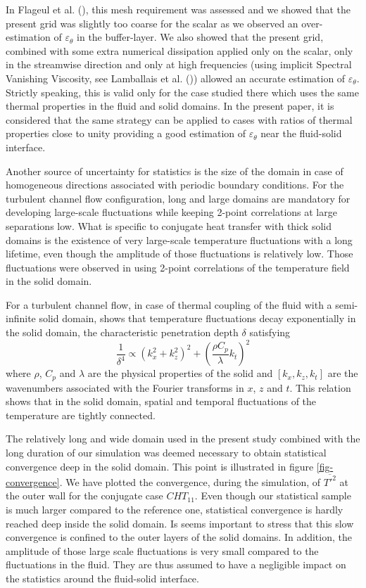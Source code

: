 \documentclass[review]{elsarticle}
\begin{document}
In Flageul et al. (\cite{flageul2015dns}), this mesh requirement was assessed and we showed that the present grid was slightly too coarse for the scalar as we observed an over-estimation of $\varepsilon_\theta$ in the buffer-layer.
We also showed that the present grid, combined with some extra numerical dissipation applied only on the scalar, only in the streamwise direction and only at high frequencies (using implicit Spectral Vanishing Viscosity, see Lamballais et al. (\cite{lamballais2011straightforward})) allowed an accurate estimation of $\varepsilon_\theta$.
Strictly speaking, this is valid only for the case studied there which uses the same thermal properties in the fluid and solid domains.
In the present paper, it is considered that the same strategy can be applied to cases with ratios of thermal properties close to unity providing a good estimation of $\varepsilon_\theta$ near the fluid-solid interface.

Another source of uncertainty for statistics is the size of the domain in case of homogeneous directions associated with periodic boundary conditions.
For the turbulent channel flow configuration, long and large domains are mandatory for developing large-scale fluctuations while keeping 2-point correlations at large separations low.
What is specific to conjugate heat transfer with thick solid domains is the existence of very large-scale temperature fluctuations with a long lifetime, even though the amplitude of those fluctuations is relatively low.
Those fluctuations were observed in \cite{flageul2015dns} using 2-point correlations of the temperature field in the solid domain.

For a turbulent channel flow, in case of thermal coupling of the fluid with a semi-infinite solid domain, \cite{flageul2015dns} shows that temperature fluctuations decay exponentially in the solid domain, the characteristic penetration depth $\delta$ satisfying
$$\frac{1}{\delta^4} \propto \left( k_x^2 + k_z^2 \right)^2 + \left( \frac{\rho C_p}{\lambda} k_t \right)^2 $$
where $\rho$, $C_p$ and $\lambda$ are the physical properties of the solid and $[k_x, k_z, k_t]$ are the wavenumbers associated with the Fourier transforms in $x$, $z$ and $t$.
This relation shows that in the solid domain, spatial and temporal fluctuations of the temperature are tightly connected.

The relatively long and wide domain used in the present study combined with the long duration of our simulation was deemed necessary to obtain statistical convergence deep in the solid domain.
This point is illustrated in figure \ref{fig-convergence}.
We have plotted the convergence, during the simulation, of $\overline{T'^2}$ at the outer wall for the conjugate case $CHT_{11}$.
Even though our statistical sample is much larger compared to the reference one, statistical convergence is hardly reached deep inside the solid domain.
Is seems important to stress that this slow convergence is confined to the outer layers of the solid domains.
In addition, the amplitude of those large scale fluctuations is very small compared to the fluctuations in the fluid.
They are thus assumed to have a negligible impact on the statistics around the fluid-solid interface.
\end{document}
